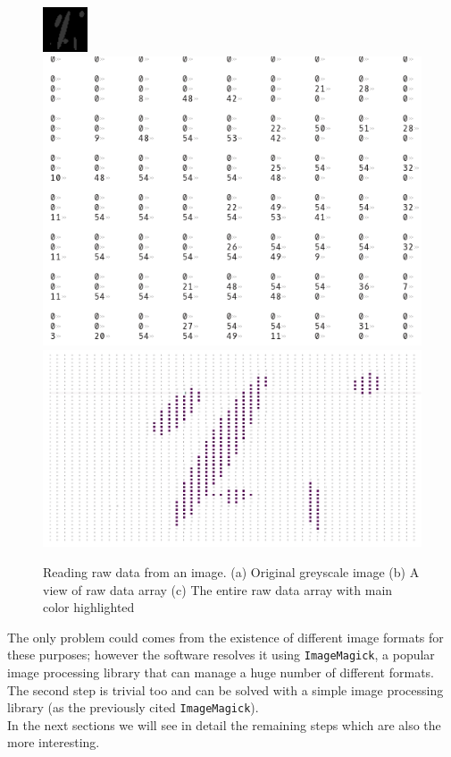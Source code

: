 \begin{figure}[htb] %
   \centering
   \includegraphics[width=0.27\linewidth]{images/grayscalesample.png}
   \includegraphics[width=0.47\linewidth]{images/imArraypart.png} \\
   
   \includegraphics[width=0.67\linewidth]{images/imArrayfull.png} \hfill
   \caption[Reading raw data from an image]{Reading raw data from an image. (a) Original greyscale image (b) A view of raw data array (c) The entire raw data array with main color highlighted}
   \label{fig:rawImage}
\end{figure}

The only problem could comes from the existence of different image formats for these purposes; however the software resolves it using \texttt{ImageMagick}, a popular image processing library that can manage a huge number of different formats. The second step is trivial too and can be solved with a simple image processing library (as the previously cited \texttt{ImageMagick}).\\

In the next sections we will see in detail the remaining steps which are also the more interesting.

